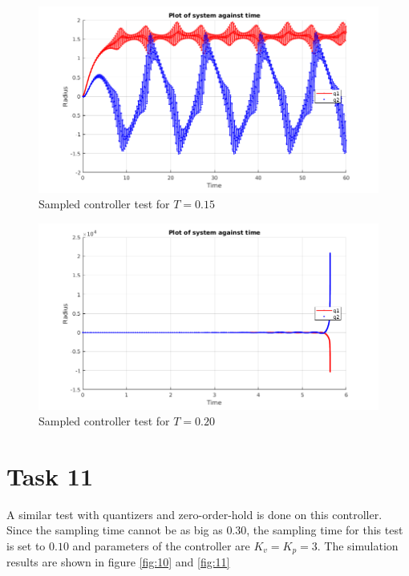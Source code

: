 \documentclass[a4paper,12pt,oneside,onecolumn]{article} %
\begin{document}
\begin{figure}[ht]
    \centering
    \includegraphics[scale=0.4]{zoh2_15.png}
    \caption{Sampled controller test for $T=0.15$}
    \label{fig:8}
\end{figure}  

\begin{figure}[ht]
    \centering
    \includegraphics[scale=0.4]{zoh2_20.png}
    \caption{Sampled controller test for $T=0.20$}
    \label{fig:9}
\end{figure}  



\section*{Task 11}
A similar test with quantizers and zero-order-hold is done on this controller. Since the sampling time cannot be as big as $0.30$, the sampling time for this test is set to $0.10$ and parameters of the controller are $K_v = K_p = 3$. The simulation results are shown in figure \ref{fig:10} and \ref{fig:11}
\end{document}
